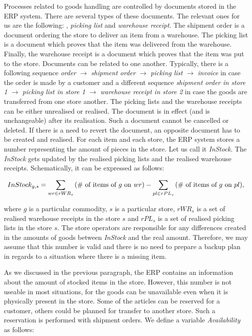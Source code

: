 Processes related to goods handling are controlled by documents stored in the ERP system. There are several types of these documents. The relevant ones for us are the following:
, {\em picking list} and {\em warehouse 
receipt}. The shipment order is a document ordering the store to deliver an item from a warehouse. The picking list is a document which proves that the item was delivered from the warehouse. Finally,
the warehouse receipt is a document which proves that the item was put to the store. Documents can be related to one another. Typically, there is a following sequence {\em order} $\rightarrow$ {\em shipment order} 
$\rightarrow$ {\em picking list} $\rightarrow$ {\em invoice} in case the order is made by a customer and a different sequence {\em shipment order in store 1} $\rightarrow$ {\em picking list in store 1} $\rightarrow$
{\em warehouse receipt in store 2} in case the goods are transferred from one store another. The picking lists and the warehouse receipts can be either unrealised or realised. The document is in effect 
(and is unchangeable) after its realisation. Such a document cannot be cancelled or
deleted. If there is a need to revert the document, an opposite document has to be created and realised. For each item and each store, the ERP system stores a number representing the amount of pieces in the store. Let us call it {\em InStock}. The {\em InStock} gets updated by the realised picking lists and the realised warehouse receipts. Schematically, it can be expressed as follows:

$$InStock_{g,s} = \sum_{wr \in rWR_s}{\left( \mathbox{\# of items of $g$ on $wr$}  \right)} - \sum_{pl \in rPL_s}{\left(\mathbox{\# of items of $g$ on $pl$}\right)},$$

\noindent where $g$ is a particular commodity, $s$ is a particular store, $rWR_s$ is a set of realised warehouse receipts in the store $s$ and $rPL_s$ is a set of realised picking lists in the store $s$. 
The store operators are responsible for any differences created in the amounts of goods between {\em InStock} and the real amount. Therefore, we may assume that this number is valid and there is no need to 
prepare a backup plan in regards to a situation where there is a missing item.

As we discussed in the previous paragraph, the ERP contains an information about the amount of stocked items in the store. However, this number is not useable in most situations, for the goods can be 
unavailable even when it is physically present in the store. Some of the articles can be reserved for a customer, others could be planned for transfer to another store. Such a reservation
is performed with shipment orders. We define a variable {\em Availability} as follows:

